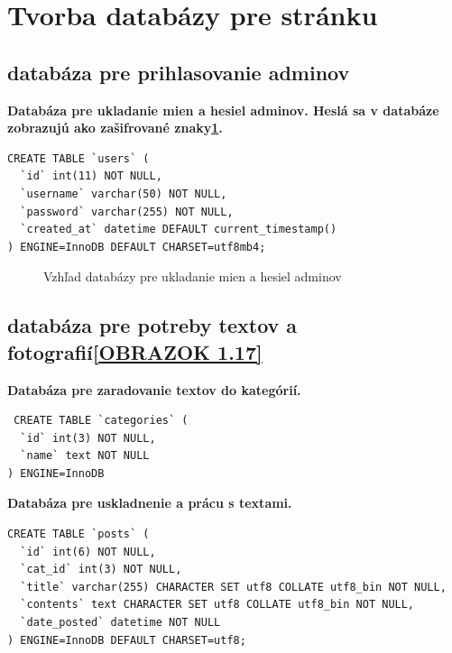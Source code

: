 \section{Tvorba databázy pre stránku}
\subsection{databáza pre prihlasovanie adminov}
\vspace{0.5cm}
\textbf{Databáza pre ukladanie mien a hesiel adminov. Heslá sa v databáze zobrazujú ako zašifrované znaky\ref{OBRAZOK 1.16}.}
\vspace{0.5cm}
\begin{lstlisting}
CREATE TABLE `users` (
  `id` int(11) NOT NULL,
  `username` varchar(50) NOT NULL,
  `password` varchar(255) NOT NULL,
  `created_at` datetime DEFAULT current_timestamp()
) ENGINE=InnoDB DEFAULT CHARSET=utf8mb4;
\end{lstlisting}

\begin{figure}[!tbh]
\centering
\setlength{\fboxsep}{0pt}%
\setlength{\fboxrule}{1pt}%
\caption{Vzhľad databázy pre ukladanie mien a hesiel adminov}\label{OBRAZOK 1.16}
\end{figure}


\subsection{databáza pre potreby textov a fotografií\ref{OBRAZOK 1.17}}
\vspace{0.5cm}
\textbf{Databáza pre zaradovanie textov do kategórií.}
\vspace{0.5cm}
\begin{lstlisting}
 CREATE TABLE `categories` (
  `id` int(3) NOT NULL,
  `name` text NOT NULL
) ENGINE=InnoDB
\end{lstlisting}

\vspace{0.5cm}
\textbf{Databáza pre uskladnenie a prácu s textami.}
\vspace{0.5cm}
\begin{lstlisting}
CREATE TABLE `posts` (
  `id` int(6) NOT NULL,
  `cat_id` int(3) NOT NULL,
  `title` varchar(255) CHARACTER SET utf8 COLLATE utf8_bin NOT NULL,
  `contents` text CHARACTER SET utf8 COLLATE utf8_bin NOT NULL,
  `date_posted` datetime NOT NULL
) ENGINE=InnoDB DEFAULT CHARSET=utf8;
\end{lstlisting}

